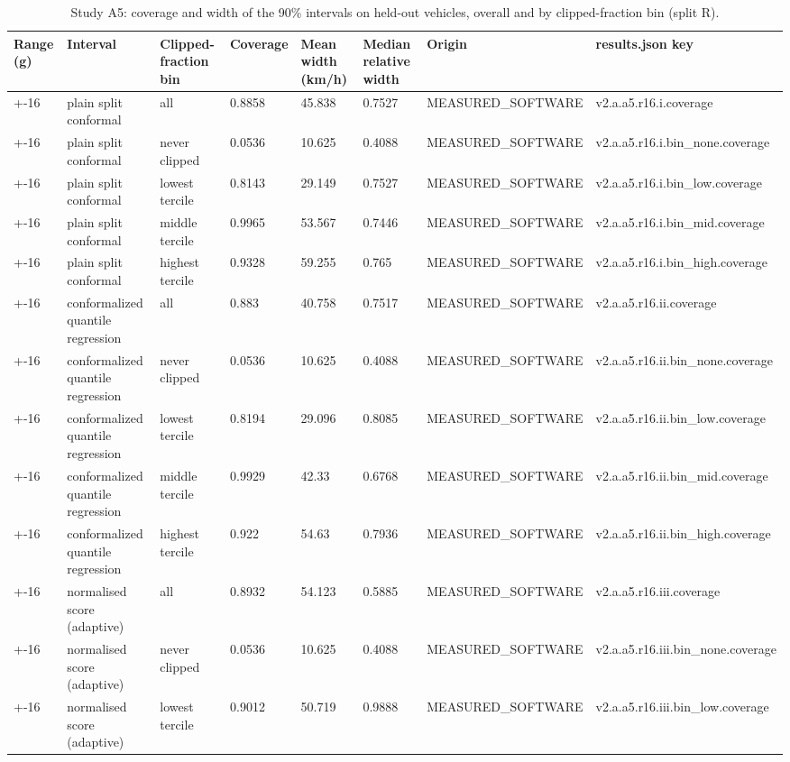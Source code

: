 \begin{table}[t]
\centering
\small
\caption{Study A5: coverage and width of the 90\% intervals on held-out vehicles, overall and by clipped-fraction bin (split R).}
\label{tab:v2_tab_intervals}
\begin{tabular}{llllllll}
\toprule
Range (g) & Interval & Clipped-fraction bin & Coverage & Mean width (km/h) & Median relative width & Origin & results.json key \\
\midrule
+-16 & plain split conformal & all & 0.8858 & 45.838 & 0.7527 & MEASURED\_SOFTWARE & v2.a.a5.r16.i.coverage \\
+-16 & plain split conformal & never clipped & 0.0536 & 10.625 & 0.4088 & MEASURED\_SOFTWARE & v2.a.a5.r16.i.bin\_none.coverage \\
+-16 & plain split conformal & lowest tercile & 0.8143 & 29.149 & 0.7527 & MEASURED\_SOFTWARE & v2.a.a5.r16.i.bin\_low.coverage \\
+-16 & plain split conformal & middle tercile & 0.9965 & 53.567 & 0.7446 & MEASURED\_SOFTWARE & v2.a.a5.r16.i.bin\_mid.coverage \\
+-16 & plain split conformal & highest tercile & 0.9328 & 59.255 & 0.765 & MEASURED\_SOFTWARE & v2.a.a5.r16.i.bin\_high.coverage \\
+-16 & conformalized quantile regression & all & 0.883 & 40.758 & 0.7517 & MEASURED\_SOFTWARE & v2.a.a5.r16.ii.coverage \\
+-16 & conformalized quantile regression & never clipped & 0.0536 & 10.625 & 0.4088 & MEASURED\_SOFTWARE & v2.a.a5.r16.ii.bin\_none.coverage \\
+-16 & conformalized quantile regression & lowest tercile & 0.8194 & 29.096 & 0.8085 & MEASURED\_SOFTWARE & v2.a.a5.r16.ii.bin\_low.coverage \\
+-16 & conformalized quantile regression & middle tercile & 0.9929 & 42.33 & 0.6768 & MEASURED\_SOFTWARE & v2.a.a5.r16.ii.bin\_mid.coverage \\
+-16 & conformalized quantile regression & highest tercile & 0.922 & 54.63 & 0.7936 & MEASURED\_SOFTWARE & v2.a.a5.r16.ii.bin\_high.coverage \\
+-16 & normalised score (adaptive) & all & 0.8932 & 54.123 & 0.5885 & MEASURED\_SOFTWARE & v2.a.a5.r16.iii.coverage \\
+-16 & normalised score (adaptive) & never clipped & 0.0536 & 10.625 & 0.4088 & MEASURED\_SOFTWARE & v2.a.a5.r16.iii.bin\_none.coverage \\
+-16 & normalised score (adaptive) & lowest tercile & 0.9012 & 50.719 & 0.9888 & MEASURED\_SOFTWARE & v2.a.a5.r16.iii.bin\_low.coverage \\

\end{tabular}
\end{table}
